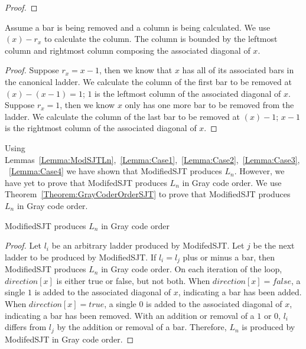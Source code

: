 {\begin{proof}
\end{proof}
\begin{lemma}
  Assume a bar is being removed and a column is being calculated. We use $(x)-r_{x}$ to calculate the column. 
  The column is bounded by the leftmost column and rightmost column composing the associated diagonal of $x$.
  \label{Lemma:Case4}
\end{lemma}
\begin{proof}
  Suppose $r_{x}=x-1$, then we know that $x$ has all of its associated bars in the canonical ladder. We calculate the column 
  of the first bar to be removed at $(x)-(x-1)=1$; $1$ is the leftmost column of the associated diagonal of $x$. Suppose 
  $r_{x}=1$, then we know $x$ only has one more bar to be removed from the ladder. We calculate the column of the last bar to be 
  removed at $(x)-1$; $x-1$ is the rightmost column of the associated diagonal of $x$.
\end{proof}

Using Lemmas~\ref{Lemma:ModSJTLn},~\ref{Lemma:Case1},~\ref{Lemma:Case2},~\ref{Lemma:Case3},~\ref{Lemma:Case4} we have shown that 
{\sc ModifiedSJT} produces $L_{n}$. However, we have yet to prove that {\sc ModifedSJT} produces $L_{n}$ in Gray code order. 
We use Theorem~\ref{Theorem:GrayCoderOrderSJT} to prove that {\sc ModifiedSJT} produces $L_{n}$ in Gray code order. 
\begin{theorem}
  {\sc ModifiedSJT} produces $L_{n}$ in Gray code order
  \label{Theorem:GrayCoderOrderSJT}
\end{theorem}
\begin{proof}
  Let $l_{i}$ be an arbitrary ladder produced by {\sc ModifedSJT}. Let $j$ be the next ladder to be produced by {\sc ModifiedSJT}. If 
  $l_{i}=l_{j}$ plus or minus a bar, then {\sc ModifiedSJT} produces $L_{n}$ in Gray code order. On each iteration of the loop, $direction[x]$ 
  is either true or false, but not both. When $direction[x]=false$, a single $1$ is added to the associated diagonal of $x$, indicating 
  a bar has been added. When $direction[x]=true$, 
  a single $0$ is added to the associated diagonal of $x$, indicating a bar has been removed. With an addition or removal of a $1$ or $0$, $l_{i}$ 
  differs from $l_{j}$ by the addition or removal of a bar. Therefore, $L_{n}$ is produced by {\sc ModifedSJT} in Gray code order.
    

\end{proof}}
